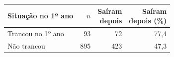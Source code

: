 \begin{tabular}{lrrr}
\toprule
Situação no 1º ano & $n$ & \makecell[r]{Saíram\\depois} & \makecell[r]{Saíram\\depois (\%)} \\
\midrule
Trancou no 1º ano & 93 & 72 & 77,4 \\
Não trancou & 895 & 423 & 47,3 \\
\bottomrule
\end{tabular}
